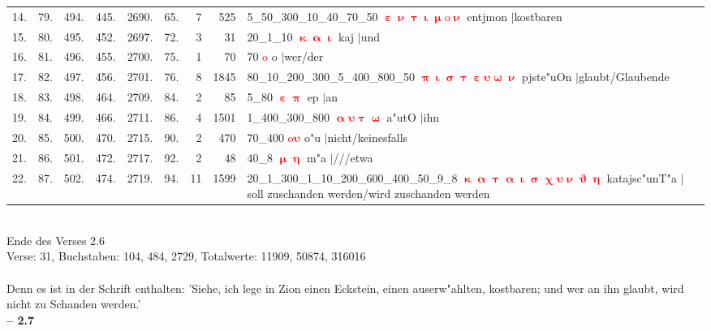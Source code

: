 \documentclass[a4paper,10pt,landscape]{article}
\begin{document}
\begin{tabular}{rrrrrrrrp{120mm}}
14.&79.&494.&445.&2690.&65.&7&525&5\_50\_300\_10\_40\_70\_50 \textcolor{red}{$\boldsymbol{\upepsilon\upnu\uptau\upiota\upmu\mathrm{o}\upnu}$} entjmon $|$kostbaren\\
15.&80.&495.&452.&2697.&72.&3&31&20\_1\_10 \textcolor{red}{$\boldsymbol{\upkappa\upalpha\upiota}$} kaj $|$und\\
16.&81.&496.&455.&2700.&75.&1&70&70 \textcolor{red}{$\boldsymbol{\mathrm{o}}$} o $|$wer/der\\
17.&82.&497.&456.&2701.&76.&8&1845&80\_10\_200\_300\_5\_400\_800\_50 \textcolor{red}{$\boldsymbol{\uppi\upiota\upsigma\uptau\upepsilon\upsilon\upomega\upnu}$} pjste"uOn $|$glaubt/Glaubende\\
18.&83.&498.&464.&2709.&84.&2&85&5\_80 \textcolor{red}{$\boldsymbol{\upepsilon\uppi}$} ep $|$an\\
19.&84.&499.&466.&2711.&86.&4&1501&1\_400\_300\_800 \textcolor{red}{$\boldsymbol{\upalpha\upsilon\uptau\upomega}$} a"utO $|$ihn\\
20.&85.&500.&470.&2715.&90.&2&470&70\_400 \textcolor{red}{$\boldsymbol{\mathrm{o}\upsilon}$} o"u $|$nicht/keinesfalls\\
21.&86.&501.&472.&2717.&92.&2&48&40\_8 \textcolor{red}{$\boldsymbol{\upmu\upeta}$} m"a $|$///etwa\\
22.&87.&502.&474.&2719.&94.&11&1599&20\_1\_300\_1\_10\_200\_600\_400\_50\_9\_8 \textcolor{red}{$\boldsymbol{\upkappa\upalpha\uptau\upalpha\upiota\upsigma\upchi\upsilon\upnu\upvartheta\upeta}$} katajsc"unT"a $|$soll zuschanden werden/wird zuschanden werden\\
\end{tabular}\medskip \\
Ende des Verses 2.6\\
Verse: 31, Buchstaben: 104, 484, 2729, Totalwerte: 11909, 50874, 316016\\
\\
Denn es ist in der Schrift enthalten: 'Siehe, ich lege in Zion einen Eckstein, einen auserw"ahlten, kostbaren; und wer an ihn glaubt, wird nicht zu Schanden werden.'\\
\newpage 
{\bf -- 2.7}\\
\medskip \\
\end{document}
